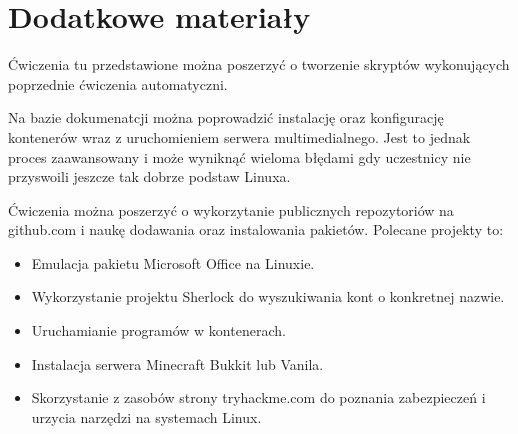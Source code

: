 \documentclass[10pt,a4paper]{article}
\begin{document}
\section{Dodatkowe materiały}

Ćwiczenia tu przedstawione można poszerzyć o tworzenie skryptów wykonujących poprzednie ćwiczenia automatyczni.\\ \par  Na bazie dokumenatcji można poprowadzić instalację oraz konfigurację kontenerów wraz z uruchomieniem serwera multimedialnego. Jest to jednak proces zaawansowany i może wyniknąć wieloma błędami gdy uczestnicy nie przyswoili jeszcze tak dobrze podstaw Linuxa.\\ \par Ćwiczenia można poszerzyć o wykorzytanie publicznych repozytoriów na github.com i naukę dodawania oraz instalowania pakietów. Polecane projekty to:
\begin{itemize}
\item Emulacja pakietu Microsoft Office na Linuxie.
\item Wykorzystanie projektu Sherlock do wyszukiwania kont o konkretnej nazwie.
\item Uruchamianie programów w kontenerach.
\item Instalacja serwera Minecraft Bukkit lub Vanila.
\item Skorzystanie z zasobów strony tryhackme.com do poznania zabezpieczeń i urzycia narzędzi na systemach Linux.\\\\
\end{itemize}
\end{document}

